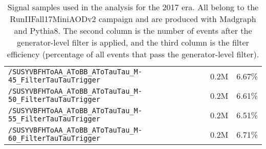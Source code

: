 \begin{table}[ht]
\begin{center}
{\begin{tabular}{|l|c|c|}
    \texttt{/SUSYVBFHToAA\_AToBB\_AToTauTau\_M-45\_FilterTauTauTrigger} & 0.2M & 6.67\%\\
    \texttt{/SUSYVBFHToAA\_AToBB\_AToTauTau\_M-50\_FilterTauTauTrigger} & 0.2M & 6.61\%\\
    \texttt{/SUSYVBFHToAA\_AToBB\_AToTauTau\_M-55\_FilterTauTauTrigger} & 0.2M & 6.51\%\\
    \texttt{/SUSYVBFHToAA\_AToBB\_AToTauTau\_M-60\_FilterTauTauTrigger} & 0.2M & 6.71\%\\
    \hline
    \end{tabular}
    }
    \end{center}
    \caption{Signal samples used in the analysis for the 2017 era. All belong to the RunIIFall17MiniAODv2 campaign and are produced with Madgraph and Pythia8. The second column is the number of events after the generator-level filter is applied, and the third column is the filter efficiency (percentage of all events that pass the generator-level filter).}
    \label{tab:2017signal}
    \end{table}
    
